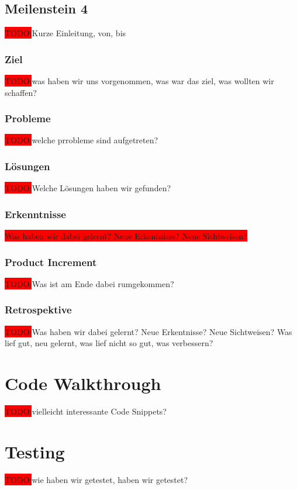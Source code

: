 \documentclass[10pt, a4paper, draft]{article}
\begin{document}
\subsection{Meilenstein 4}
\colorbox{red}{TODO:}Kurze Einleitung, von, bis
\subsubsection{Ziel}
\colorbox{red}{TODO:}was haben wir uns vorgenommen, was war das ziel, was wollten wir schaffen?
\subsubsection{Probleme}
\colorbox{red}{TODO:}welche prrobleme sind aufgetreten?

\subsubsection{Lösungen}
\colorbox{red}{TODO:}Welche Lösungen haben wir gefunden?

\subsubsection{Erkenntnisse}
\colorbox{red}{Was haben wir dabei gelernt? Neue Erkentnisse? Neue Sichtweisen?}

\subsubsection{Product Increment}
\colorbox{red}{TODO:}Was ist am Ende dabei rumgekommen?

\subsubsection{Retrospektive}
\colorbox{red}{TODO:}Was haben wir dabei gelernt? Neue Erkentnisse? Neue Sichtweisen?
Was lief gut, neu gelernt, was lief nicht so gut, was verbessern?

\section{Code Walkthrough}
\colorbox{red}{TODO:}vielleicht interessante Code Snippets?

\section{Testing}
\colorbox{red}{TODO:}wie haben wir getestet, haben wir getestet?
\end{document}
